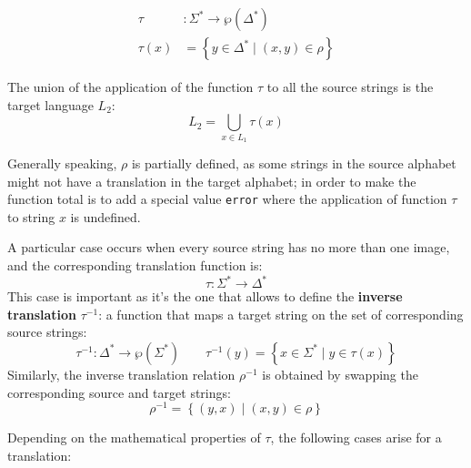 \documentclass[english]{article}
\begin{document}
\begin{gather*}
  \begin{aligned}
    \tau    & : \Sigma^\ast \rightarrow \wp \left( \Delta^\ast \right)               \\
    \tau(x) & = \left\{ y \in \Delta^\ast \mid \left( x, y \right) \in \rho \right\}
  \end{aligned}
\end{gather*}

The union of the application of the function \(\tau\) to all the source strings is the target language \(L_2\):
\[ L_2 = \bigcup_{x \in L_1} \tau(x) \]

\bigskip
Generally speaking, \(\rho\) is partially defined, as some strings in the source alphabet might not have a translation in the target alphabet;
in order to make the function total is to add a special value \texttt{error} where the application of function \(\tau\) to string \(x\) is undefined.

A particular case occurs when every source string has no more than one image, and the corresponding translation function is:
\[ \tau : \Sigma^\ast \rightarrow \Delta^\ast \]
This case is important as it's the one that allows to define the \textbf{inverse translation} \(\tau^{-1}\):
a function that maps a target string on the set of corresponding source strings:
\[ \tau^{-1} : \Delta^\ast \rightarrow \wp\left( \Sigma^\ast \right) \qquad \tau^{-1}(y) = \left\{ x \in \Sigma^\ast \mid y \in \tau(x) \right\} \]
Similarly, the inverse translation relation \(\rho^{-1}\) is obtained by swapping the corresponding source and target strings:
\[ \rho^{-1} = \left\{ \left( y, x \right) \mid \left( x, y \right) \in \rho \right\} \]

\bigskip
Depending on the mathematical properties of \(\tau\), the following cases arise for a translation:
\end{document}
